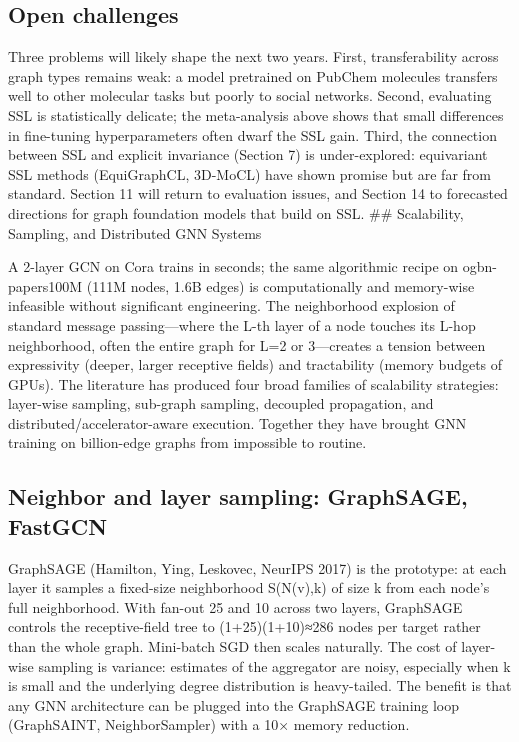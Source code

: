 \subsection{Open challenges}\label{open-challenges}

Three problems will likely shape the next two years. First, transferability across graph types remains weak: a model pretrained on PubChem molecules transfers well to other molecular tasks but poorly to social networks. Second, evaluating SSL is statistically delicate; the meta-analysis above shows that small differences in fine-tuning hyperparameters often dwarf the SSL gain. Third, the connection between SSL and explicit invariance (Section 7) is under-explored: equivariant SSL methods (EquiGraphCL, 3D-MoCL) have shown promise but are far from standard. Section 11 will return to evaluation issues, and Section 14 to forecasted directions for graph foundation models that build on SSL.
\#\# Scalability, Sampling, and Distributed GNN Systems

A 2-layer GCN on Cora trains in seconds; the same algorithmic recipe on ogbn-papers100M (111M nodes, 1.6B edges) is computationally and memory-wise infeasible without significant engineering. The neighborhood explosion of standard message passing---where the L-th layer of a node touches its L-hop neighborhood, often the entire graph for L=2 or 3---creates a tension between expressivity (deeper, larger receptive fields) and tractability (memory budgets of GPUs). The literature has produced four broad families of scalability strategies: layer-wise sampling, sub-graph sampling, decoupled propagation, and distributed/accelerator-aware execution. Together they have brought GNN training on billion-edge graphs from impossible to routine.

\subsection{Neighbor and layer sampling: GraphSAGE, FastGCN}\label{neighbor-and-layer-sampling-graphsage-fastgcn}

GraphSAGE (Hamilton, Ying, Leskovec, NeurIPS 2017) is the prototype: at each layer it samples a fixed-size neighborhood S(N(v),k) of size k from each node's full neighborhood. With fan-out 25 and 10 across two layers, GraphSAGE controls the receptive-field tree to (1+25)(1+10)≈286 nodes per target rather than the whole graph. Mini-batch SGD then scales naturally. The cost of layer-wise sampling is variance: estimates of the aggregator are noisy, especially when k is small and the underlying degree distribution is heavy-tailed. The benefit is that any GNN architecture can be plugged into the GraphSAGE training loop (GraphSAINT, NeighborSampler) with a 10× memory reduction.

